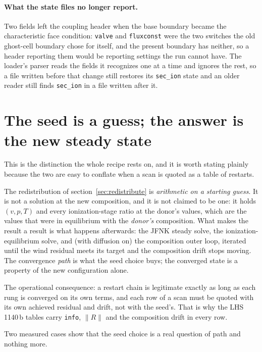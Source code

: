 \documentclass[english,a4paper]{my_memo}
\begin{document}
\paragraph{What the state files no longer report.} Two fields left the
coupling header when the base boundary became the characteristic face
condition: \verb|valve| and \verb|fluxconst| were the two switches the old
ghost-cell boundary chose for itself, and the present boundary has neither,
so a header reporting them would be reporting settings the run cannot have.
The loader's parser reads the fields it recognizes one at a time and ignores
the rest, so a file written before that change still restores its
\verb|sec_ion| state and an older reader still finds \verb|sec_ion| in a
file written after it.

\section{The seed is a guess; the answer is the new steady state}
\label{sec:seed}

This is the distinction the whole recipe rests on, and it is worth stating
plainly because the two are easy to conflate when a scan is quoted as a
table of restarts.

\medskip
\noindent The redistribution of section~\ref{sec:redistribute} is
\emph{arithmetic on a starting guess}. It is not a solution at the new
composition, and it is not claimed to be one: it holds $(v, p, T)$ and every
ionization-stage ratio at the donor's values, which are the values that were
in equilibrium with the \emph{donor's} composition. What makes the result a
result is what happens afterwards: the JFNK steady solve, the
ionization-equilibrium solve, and (with diffusion on) the composition outer
loop, iterated until the wind residual meets its target and the composition
drift stops moving. The convergence \emph{path} is what the seed choice
buys; the converged state is a property of the new configuration alone.

\medskip
\noindent The operational consequence: a restart chain is legitimate exactly
as long as each rung is converged on its own terms, and each row of a scan
must be quoted with its own achieved residual and drift, not with the
seed's. That is why the LHS\,1140\,b tables carry \verb|info|, $\|R\|$ and
the composition drift in every row.

\medskip
\noindent Two measured cases show that the seed choice is a real question of
path and nothing more.
\end{document}
